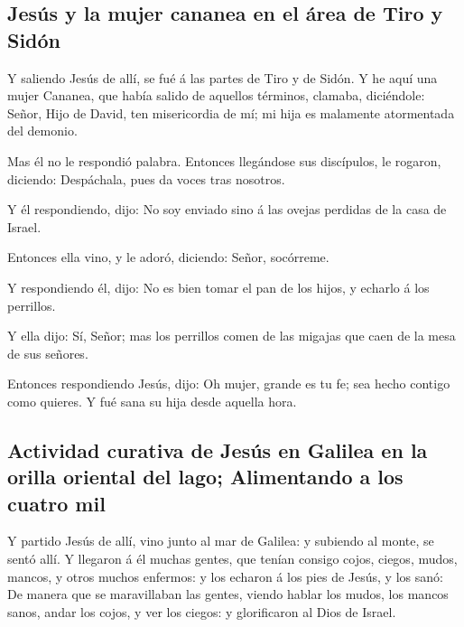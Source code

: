 \hypertarget{jesuxfas-y-la-mujer-cananea-en-el-uxe1rea-de-tiro-y-siduxf3n}{%
\subsection{Jesús y la mujer cananea en el área de Tiro y
Sidón}\label{jesuxfas-y-la-mujer-cananea-en-el-uxe1rea-de-tiro-y-siduxf3n}}

 Y saliendo Jesús de allí, se fué á las partes de Tiro y de
Sidón.  Y he aquí una mujer Cananea, que había salido de
aquellos términos, clamaba, diciéndole: Señor, Hijo de David, ten
misericordia de mí; mi hija es malamente atormentada del demonio.

 Mas él no le respondió palabra. Entonces llegándose sus
discípulos, le rogaron, diciendo: Despáchala, pues da voces tras
nosotros.

 Y él respondiendo, dijo: No soy enviado sino á las ovejas
perdidas de la casa de Israel.

 Entonces ella vino, y le adoró, diciendo: Señor,
socórreme.

 Y respondiendo él, dijo: No es bien tomar el pan de los
hijos, y echarlo á los perrillos.

 Y ella dijo: Sí, Señor; mas los perrillos comen de las
migajas que caen de la mesa de sus señores.

 Entonces respondiendo Jesús, dijo: Oh mujer, grande es tu
fe; sea hecho contigo como quieres. Y fué sana su hija desde aquella
hora.

\hypertarget{actividad-curativa-de-jesuxfas-en-galilea-en-la-orilla-oriental-del-lago-alimentando-a-los-cuatro-mil}{%
\subsection{Actividad curativa de Jesús en Galilea en la orilla oriental
del lago; Alimentando a los cuatro
mil}\label{actividad-curativa-de-jesuxfas-en-galilea-en-la-orilla-oriental-del-lago-alimentando-a-los-cuatro-mil}}

 Y partido Jesús de allí, vino junto al mar de Galilea: y
subiendo al monte, se sentó allí.  Y llegaron á él muchas
gentes, que tenían consigo cojos, ciegos, mudos, mancos, y otros muchos
enfermos: y los echaron á los pies de Jesús, y los sanó: 
De manera que se maravillaban las gentes, viendo hablar los mudos, los
mancos sanos, andar los cojos, y ver los ciegos: y glorificaron al Dios
de Israel.

